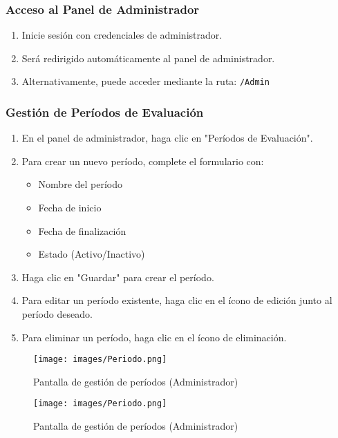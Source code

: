 \documentclass[12pt,a4paper]{article}
\begin{document}
\subsubsection{Acceso al Panel de Administrador}
\begin{enumerate}
    \item Inicie sesión con credenciales de administrador.
    \item Será redirigido automáticamente al panel de administrador.
    \item Alternativamente, puede acceder mediante la ruta: \texttt{/Admin}
\end{enumerate}

\subsubsection{Gestión de Períodos de Evaluación}
\begin{enumerate}
    \item En el panel de administrador, haga clic en "Períodos de Evaluación".
    \item Para crear un nuevo período, complete el formulario con:
    \begin{itemize}
        \item Nombre del período
        \item Fecha de inicio
        \item Fecha de finalización
        \item Estado (Activo/Inactivo)
    \end{itemize}
    \item Haga clic en "Guardar" para crear el período.
    \item Para editar un período existente, haga clic en el ícono de edición junto al período deseado.
    \item Para eliminar un período, haga clic en el ícono de eliminación.
\end{enumerate}

\begin{figure}[H]
  \centering
  \texttt{[image: images/Periodo.png]}
  \caption{Pantalla de gestión de períodos (Administrador)}
  \label{fig:admin_periodos}
\end{figure}

\begin{figure}[H]
  \centering
  \texttt{[image: images/Periodo.png]}
  \caption{Pantalla de gestión de períodos (Administrador)}
  \label{fig:admin_periodos}
\end{figure}
\end{document}
